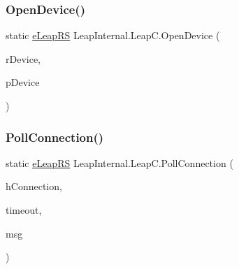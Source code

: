 \mbox{\label{class_leap_internal_1_1_leap_c_abde768c9d9266c586861d3e123ee2f8f}} 
\subsubsection{\texorpdfstring{OpenDevice()}{OpenDevice()}}
{\footnotesize\ttfamily static \mbox{\hyperlink{namespace_leap_internal_ae50b07d24c508b84273392b6dcbea1d9}{e\+Leap\+RS}} Leap\+Internal.\+Leap\+C.\+Open\+Device (\begin{DoxyParamCaption}\item[{\mbox{\hyperlink{struct_leap_internal_1_1_l_e_a_p___d_e_v_i_c_e___r_e_f}{L\+E\+A\+P\+\_\+\+D\+E\+V\+I\+C\+E\+\_\+\+R\+EF}}}]{r\+Device,  }\item[{out Int\+Ptr}]{p\+Device }\end{DoxyParamCaption})}

\mbox{\label{class_leap_internal_1_1_leap_c_a4250f3129c57450a2f2b9e718dd6bb11}} 
\subsubsection{\texorpdfstring{PollConnection()}{PollConnection()}}
{\footnotesize\ttfamily static \mbox{\hyperlink{namespace_leap_internal_ae50b07d24c508b84273392b6dcbea1d9}{e\+Leap\+RS}} Leap\+Internal.\+Leap\+C.\+Poll\+Connection (\begin{DoxyParamCaption}\item[{Int\+Ptr}]{h\+Connection,  }\item[{U\+Int32}]{timeout,  }\item[{ref \mbox{\hyperlink{struct_leap_internal_1_1_l_e_a_p___c_o_n_n_e_c_t_i_o_n___m_e_s_s_a_g_e}{L\+E\+A\+P\+\_\+\+C\+O\+N\+N\+E\+C\+T\+I\+O\+N\+\_\+\+M\+E\+S\+S\+A\+GE}}}]{msg }\end{DoxyParamCaption})}

\mbox{\label{class_leap_internal_1_1_leap_c_a4c10837b7f5fa82c07eca68c17d3a49d}} 
